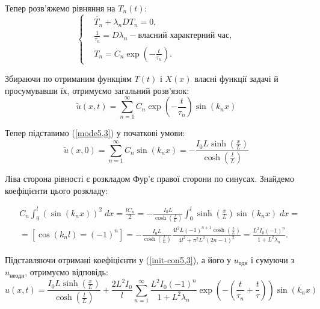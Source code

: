 Тепер розв'яжемо рівняння на $T_n(t)$:
\begin{equation} 
    \left\{ \begin{aligned}
        &\dot{T_n}+\lambda_n DT_n=0,\\
        &\frac1{\tau_n} = D\lambda_n - \text{власний характерний час},\\
        &T_n=C_n\exp{\left(-\frac t{\tau_n}\right)}.
    \end{aligned} \right.
\end{equation}

Збираючи по отриманим функціям $T(t)$ і $X(x)$ власні функції задачі й просумувавши їх, отримуємо загальний розв'язок:
\begin{equation} \label{mode5,3}
    \tilde{u}(x,t) = \sum_{n=1}^{\infty} C_n\exp{\left(-\frac t{\tau_n}\right)}\sin\left(k_n x\right)
\end{equation}

Тепер підставимо (\ref{mode5,3}) у початкові умови:
\begin{equation} \label{init-con5,3}
    \tilde{u}(x,0) = \sum_{n=1}^{\infty} C_n\sin\left(k_n x\right) = -\frac{I_0L\sinh{(\frac{x}{L})}}{\cosh{(\frac{l}{L})}}
\end{equation}

Ліва сторона рівності є розкладом Фур'є правої сторони по синусах. Знайдемо коефіцієнти цього розкладу:

\begin{equation*}
    \begin{aligned} 
        &C_n\int_{0}^{l} \left( \sin\left(k_n x\right)\right)^2\;dx= \frac{lC_n}{2}
        =-\frac{I_0L}{\cosh{(\frac{l}{L})}}\int_{0}^{l}\sinh{\left(\frac{x}{L}\right)}\sin\left(k_n x\right)\;dx=\\
        &=\left[\cos(k_n l)=(-1)^n\right]=-\frac{I_0L}{\cosh{(\frac{l}{L})}}\frac{4l^2L(-1)^{n+1}\cosh{(\frac{l}{L})}}{4l^2+\pi^2L^2(2n-1)^2}=\frac{L^2I_0(-1)^n}{1+L^2\lambda_n}.
    \end{aligned}
\end{equation*}

Підставляючи отримані коефіцієнти у (\ref{init-con5,3}), а його у $u_{\text{одн}}$ і сумуючи з $u_{\text{неодн}}$, отримуємо відповідь:
\begin{equation*} 
        u(x,t)=\frac{I_0L\sinh{(\frac{x}{L})}}{\cosh{(\frac{l}{L})}}+\frac{2L^2I_0}{l}\sum_{n=1}^{\infty}\frac{L^2I_0(-1)^n}{1+L^2\lambda_n}\exp{\left(-\left(\frac t{\tau_n}+\frac{t}{\tau}\right) \right)}\sin\left(k_n x\right)
\end{equation*}

%